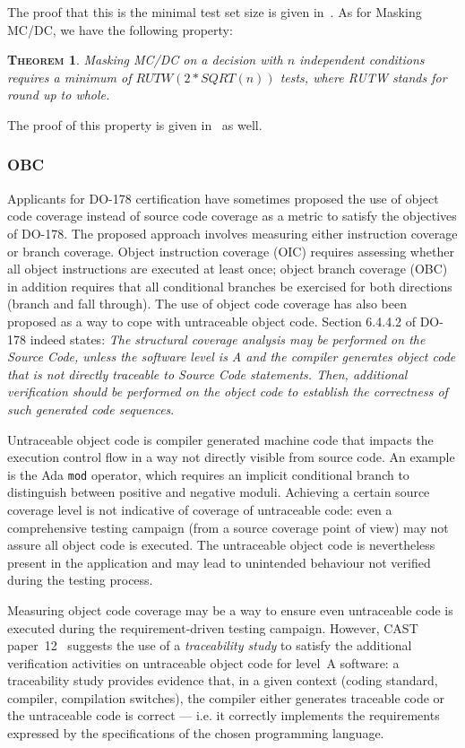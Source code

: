 \documentclass[a4paper,12pt,twoside]{article}
\newtheorem{theorem}{\textsc{Theorem}}
\begin{document}
The proof that this is the minimal test set size is given in~\cite{ar0118}.
As for Masking MC/DC, we have the following property:

\begin{theorem}
Masking MC/DC on a decision with $n$ independent conditions requires a
minimum of $RUTW(2*SQRT(n))$ tests, where RUTW stands for round up to
whole.
\end{theorem}

The proof of this property is given in~\cite{ar0118} as well.


\subsubsection{OBC}

Applicants for DO-178 certification have sometimes proposed the use of object
code coverage instead of source code coverage as a metric to satisfy the
objectives of DO-178. The proposed approach involves measuring either
instruction coverage or branch coverage. Object instruction coverage
(OIC) requires assessing whether all object instructions are executed
at least once; object branch coverage (OBC) in addition requires that
all conditional branches be exercised for both directions (branch and
fall through). The use of object code coverage has also been proposed
as a way to cope with untraceable object code. Section 6.4.4.2 of
DO-178 indeed states: \emph{The structural coverage analysis may be
performed on the Source Code, unless the software level is A and the
compiler generates object code that is not directly traceable to Source
Code statements. Then, additional verification should be performed on
the object code to establish the correctness of such generated code
sequences}.

Untraceable object code is compiler generated machine code that impacts
the execution control flow in a way not directly visible from source code. An
example is the Ada \texttt{mod} operator, which requires an implicit
conditional branch to distinguish between positive and negative
moduli. Achieving a certain source coverage level is not indicative of
coverage of untraceable code: even a comprehensive testing campaign (from a
source coverage point of view) may not assure all object code is executed.
%
The untraceable object code is nevertheless present in the application
and may lead to unintended behaviour not verified during the testing process.

Measuring object code coverage may be a way to ensure even untraceable
code is executed during the requirement-driven testing campaign. However, CAST
paper~12~\cite{cast12} suggests the use of a \emph{traceability study} to
satisfy the additional verification activities on untraceable object code for
level~A software: a traceability study provides evidence that, in a given
context (coding standard, compiler, compilation switches), the compiler either
generates traceable code or the untraceable code is correct --- i.e. it
correctly implements the requirements expressed by the specifications of the
chosen programming language.
\end{document}
